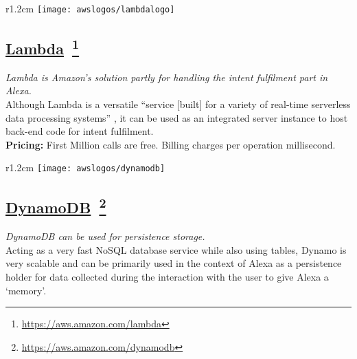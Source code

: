 	\begin{wrapfigure}[2]{r}{1.2cm}
		\texttt{[image: awslogos/lambdalogo]}
	\end{wrapfigure}
	
	

\subsection*{
	\href{https://aws.amazon.com/lambda/}{\textbf{Lambda}}~\footnote{\url{https://aws.amazon.com/lambda}}
}
	\textit{Lambda is Amazon's solution partly for handling the intent fulfilment part in Alexa.}\\
	Although Lambda is a versatile ``service [built] for a variety of real-time serverless data processing systems'' \cite{aws_website}, it can be used as an integrated server instance to host back-end code for intent fulfilment.\\	 %
	\textbf{Pricing:} First Million calls are free. Billing charges per operation millisecond.

	



\begin{wrapfigure}[2]{r}{1.2cm}
	\texttt{[image: awslogos/dynamodb]}
\end{wrapfigure}

%


\subsection*{
\href{https://aws.amazon.com/dynamodb/}{\textbf{DynamoDB}}~\footnote{\url{https://aws.amazon.com/dynamodb}}
}
\textit{DynamoDB can be used for persistence storage.}\\
Acting as a very fast NoSQL database service while also using tables,
Dynamo is very scalable and can be primarily used in the context of Alexa as a persistence holder for data collected during the interaction with the user to give Alexa a `memory'.



